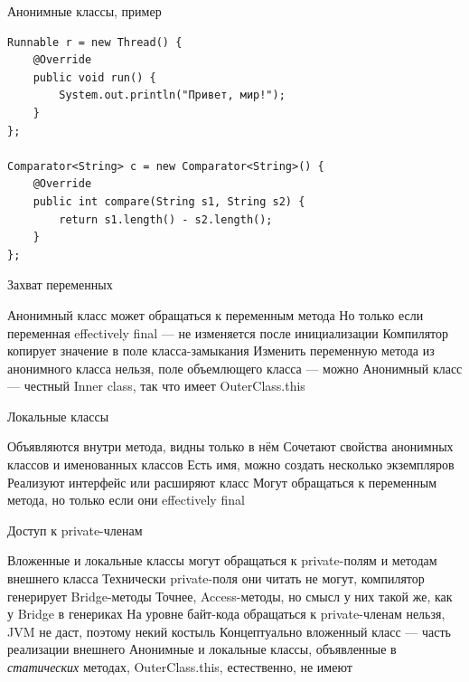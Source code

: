 \documentclass{../../slides-style}
\begin{document}
    \begin{frame}[fragile]{Анонимные классы, пример}
        \begin{small}
            \begin{verbatim}
Runnable r = new Thread() {
    @Override
    public void run() {
        System.out.println("Привет, мир!");
    }
};

Comparator<String> c = new Comparator<String>() {
    @Override
    public int compare(String s1, String s2) {
        return s1.length() - s2.length();
    }
};
            \end{verbatim}
        \end{small}
    \end{frame}

    \begin{frame}{Захват переменных}
        \begin{outline}
            \1 Анонимный класс может обращаться к переменным метода
            \1 Но только если переменная effectively final --- не изменяется после инициализации
                \2 Компилятор копирует значение в поле класса-замыкания
            \1 Изменить переменную метода из анонимного класса нельзя, поле объемлющего класса --- можно
                \2 Анонимный класс --- честный Inner class, так что имеет OuterClass.this
        \end{outline}
    \end{frame}

    \begin{frame}{Локальные классы}
        \begin{outline}
            \1 Объявляются внутри метода, видны только в нём
            \1 Сочетают свойства анонимных классов и именованных классов
                \2 Есть имя, можно создать несколько экземпляров
                \2 Реализуют интерфейс или расширяют класс
            \1 Могут обращаться к переменным метода, но только если они effectively final
        \end{outline}
    \end{frame}

    \begin{frame}{Доступ к private-членам}
        \begin{outline}
            \1 Вложенные и локальные классы могут обращаться к private-полям и методам внешнего класса
                \2 Технически private-поля они читать не могут, компилятор генерирует Bridge-методы
                    \3 Точнее, Access-методы, но смысл у них такой же, как у Bridge в генериках
                    \3 На уровне байт-кода обращаться к private-членам нельзя, JVM не даст, поэтому некий костыль
            \1 Концептуально вложенный класс --- часть реализации внешнего
            \1 Анонимные и локальные классы, объявленные в \emph{статических} методах, OuterClass.this, естественно, не имеют
        \end{outline}
    \end{frame}
\end{document}

